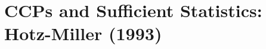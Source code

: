 \documentclass[xcolor=pdftex,dvipsnames,table,mathserif]{beamer}
\begin{document}
%
%

\section{CCPs and Sufficient Statistics: Hotz-Miller (1993)}
\end{document}
